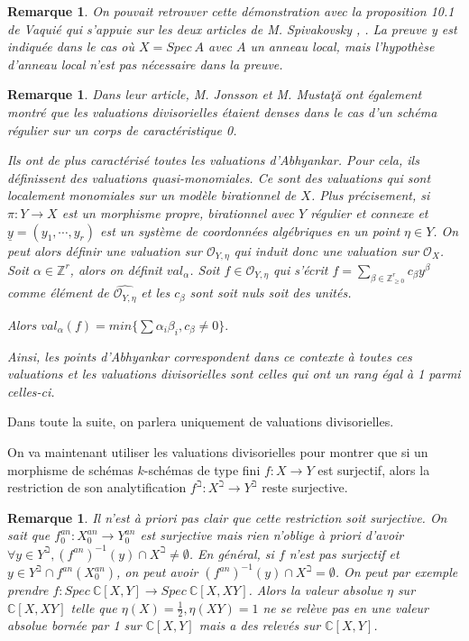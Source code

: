 \documentclass[11pt]{article}
\newcommand{\Z}{\mathbb{Z}}
\newcommand{\C}{\mathbb{C}}
\newtheorem{rem}[thm]{Remarque}
\begin{document}
\begin{rem}
On pouvait retrouver cette démonstration avec la proposition 10.1 de Vaquié \cite{VaquieValuations} qui s'appuie sur les deux articles de M. Spivakovsky \cite{SpivakovskyValuations}, \cite{SpivakovskyValuations2}. La preuve y est indiquée dans le cas où $X = Spec~A$ avec $A$ un anneau local, mais l'hypothèse d'anneau local n'est pas nécessaire dans la preuve.
\end{rem}

\begin{rem}
Dans leur article, M. Jonsson et M. Musta\c t\u a \cite{JonssonMustata} ont également montré que les valuations divisorielles étaient denses dans le cas d'un schéma régulier sur un corps de caractéristique 0. 

Ils ont de plus caractérisé toutes les valuations d'Abhyankar. Pour cela, ils définissent des valuations quasi-monomiales. Ce sont des valuations qui sont localement monomiales sur un modèle birationnel de $X$. Plus précisement, si $\pi : Y \rightarrow X$ est un morphisme propre, birationnel avec $Y$ régulier et connexe et $\underline{y} = (y_1, \cdots, y_r)$ est un système de coordonnées algébriques en un point $\eta \in Y$. On peut alors définir une valuation sur $\mathcal{O}_{Y,\eta}$ qui induit donc une valuation sur $\mathcal{O}_X$. Soit $\alpha \in \Z^r$, alors on définit $val_\alpha$. Soit $f\in \mathcal{O}_{Y,\eta}$ qui s'écrit $f = \sum_{\beta \in \Z^r_{\geq 0}} c_\beta y^\beta$ comme élément de $\hat{\mathcal{O}_{Y,\eta}}$ et les $c_\beta$ sont soit nuls soit des unités. 

Alors $val_\alpha(f) = min\lbrace \sum \alpha_i\beta_i, c_\beta\neq 0\rbrace.$

Ainsi, les points d'Abhyankar correspondent dans ce contexte à toutes ces valuations et les valuations divisorielles sont celles qui ont un rang égal à 1 parmi celles-ci.
\end{rem}

Dans toute la suite, on parlera uniquement de valuations divisorielles. 

On va maintenant utiliser les valuations divisorielles pour montrer que si un morphisme de schémas $k$-schémas de type fini $f : X \rightarrow Y$ est surjectif, alors la restriction de son analytification $f^\beth : X^\beth \rightarrow Y^\beth$ reste surjective.

\begin{rem}
Il n'est à priori pas clair que cette restriction soit surjective. On sait que $f^{an}_0 : X^{an}_0 \rightarrow Y^{an}_0$ est surjective mais rien n'oblige à priori d'avoir $\forall y \in Y^\beth, (f^{an})^{-1}(y) \cap X^\beth \neq \emptyset$. En général, si $f$ n'est pas surjectif et $y \in Y^\beth \cap f^{an}(X^{an}_0)$, on peut avoir $(f^{an})^{-1}(y) \cap X^\beth = \emptyset$. On peut par exemple prendre $f : Spec~ \C[X, Y] \rightarrow Spec~ \C[X, XY]$. Alors la valeur absolue $\eta$ sur $\C[X, XY]$ telle que $\eta (X) = \frac{1}{2}, \eta(XY) = 1$ ne se relève pas en une valeur absolue bornée par 1 sur $\C[X,Y]$ mais a des relevés sur $\C[X,Y]$.
\end{rem}
\end{document}
